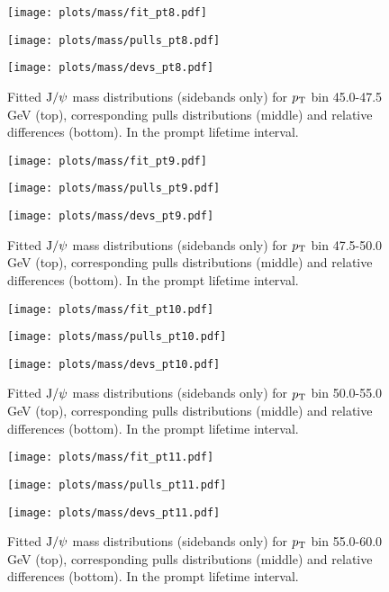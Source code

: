\pagebreak

\begin{figure}[h!]
\centering
\texttt{[image: plots/mass/fit\_pt8.pdf]}

\texttt{[image: plots/mass/pulls\_pt8.pdf]}

\texttt{[image: plots/mass/devs\_pt8.pdf]}

\caption{Fitted $\text{J/}\psi$ mass distributions (sidebands only) for $p_\text{T}$ bin 45.0-47.5 GeV (top), corresponding pulls distributions (middle) and relative differences (bottom). In the prompt lifetime interval.}\label{f:m_fit_8}
\end{figure}

\pagebreak

\begin{figure}[h!]
\centering
\texttt{[image: plots/mass/fit\_pt9.pdf]}

\texttt{[image: plots/mass/pulls\_pt9.pdf]}

\texttt{[image: plots/mass/devs\_pt9.pdf]}

\caption{Fitted $\text{J/}\psi$ mass distributions (sidebands only) for $p_\text{T}$ bin 47.5-50.0 GeV (top), corresponding pulls distributions (middle) and relative differences (bottom). In the prompt lifetime interval.}\label{f:m_fit_9}
\end{figure}

\pagebreak

\begin{figure}[h!]
\centering
\texttt{[image: plots/mass/fit\_pt10.pdf]}

\texttt{[image: plots/mass/pulls\_pt10.pdf]}

\texttt{[image: plots/mass/devs\_pt10.pdf]}

\caption{Fitted $\text{J/}\psi$ mass distributions (sidebands only) for $p_\text{T}$ bin 50.0-55.0 GeV (top), corresponding pulls distributions (middle) and relative differences (bottom). In the prompt lifetime interval.}\label{f:m_fit_10}
\end{figure}

\pagebreak

\begin{figure}[h!]
\centering
\texttt{[image: plots/mass/fit\_pt11.pdf]}

\texttt{[image: plots/mass/pulls\_pt11.pdf]}

\texttt{[image: plots/mass/devs\_pt11.pdf]}

\caption{Fitted $\text{J/}\psi$ mass distributions (sidebands only) for $p_\text{T}$ bin 55.0-60.0 GeV (top), corresponding pulls distributions (middle) and relative differences (bottom). In the prompt lifetime interval.}\label{f:m_fit_11}
\end{figure}


